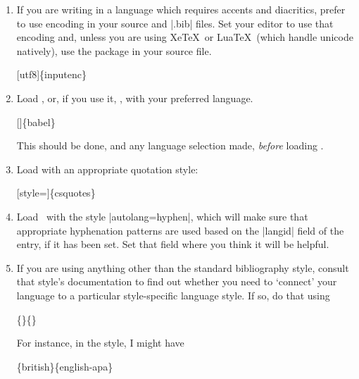 \begin{enumerate}
\item If you are writing in a language which requires accents and
  diacritics, prefer to use  encoding in your source
  and |.bib| files. Set your editor to use that encoding and, unless
  you are using Xe\TeX\ or Lua\TeX\ (which handle unicode natively),
  use the  package in your source file.
 \begin{pseudoverb}
 [utf8]\{inputenc\}
 \end{pseudoverb}
\item Load , or, if you use it,
    , with your preferred
  language.
 \begin{pseudoverb}
   []\{babel\}
 \end{pseudoverb}
 This should be done, and any language selection made, \emph{before} loading \biblatex.
\item Load  with an appropriate quotation style:
 \begin{pseudoverb}
   [style=]\{csquotes\}
 \end{pseudoverb}
\item Load \biblatex\ with the style |autolang=hyphen|, which will
  make sure that appropriate hyphenation patterns are used based on
  the |langid| field of the entry, if it has been set. Set that field
  where you think it will be helpful.
\item If you are using anything other than the standard bibliography
  style, consult that style's documentation to find out whether you
  need to `connect' your language to a particular style-specific
  language style. If so, do that using
 \begin{pseudoverb}
   \{\}\{\}
 \end{pseudoverb}
 For instance, in the  style, I might have
 \begin{pseudoverb}
   \{british\}\{english-apa\}
 \end{pseudoverb}
\end{enumerate}

